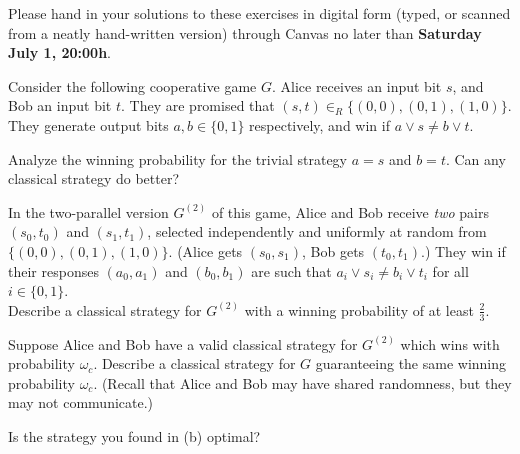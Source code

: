 \documentclass[a4paper,10pt,landscape,twocolumn]{scrartcl}
\newcommand\deadline{Saturday July 1, 20:00h}
\begin{document}
\newcommand{\Hmin}{\mathrm{H}_{\mathrm{min}}}

\homeworkproblems

{\sffamily\noindent
Please hand in your solutions to these exercises in digital form (typed, or scanned from a neatly hand-written version) through Canvas no later than \textbf{\deadline}.  %
}

\begin{exercise}
	Consider the following cooperative game $G$. Alice receives an input bit $s$, and Bob an input bit $t$. They are promised that $(s,t) \in_R \{(0,0),(0,1),(1,0)\}$. They generate output bits $a,b \in \{0,1\}$ respectively, and win if $a \vee s \neq b \vee t$.
	\begin{subex}
		Analyze the winning probability for the trivial strategy $a = s$ and $b = t$. Can any classical strategy do better?
	\end{subex}
    \begin{subex}
    	In the two-parallel version $G^{(2)}$ of this game, Alice and Bob receive \emph{two} pairs $(s_0, t_0)$ and $(s_1, t_1)$, selected independently and uniformly at random from $\{(0,0),(0,1),(1,0)\}$. (Alice gets $(s_0, s_1)$, Bob gets $(t_0, t_1)$.) They win if their responses $(a_0, a_1)$ and $(b_0, b_1)$ are such that $a_i \vee s_i \neq b_i \vee t_i$ for all $i \in \{0,1\}$.
    	\\
    	Describe a classical strategy for $G^{(2)}$ with a winning probability of at least $\frac{2}{3}$.
    \end{subex}
    \begin{subex}
    	Suppose Alice and Bob have a valid classical strategy for $G^{(2)}$ which wins with probability $\omega_c$. Describe a classical strategy for $G$ guaranteeing the same winning probability $\omega_c$. (Recall that Alice and Bob may have shared randomness, but they may not communicate.)
    \end{subex}
    \begin{subex}
    Is the strategy you found in (b) optimal?
    \end{subex}
\end{exercise}
\end{document}
